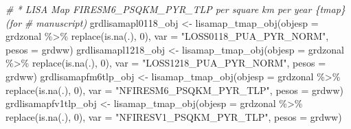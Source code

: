 \documentclass[10pt,landscape,a3paper]{article}
\newenvironment{Shaded}{\begin{snugshade}}{\end{snugshade}}
\newcommand{\AttributeTok}[1]{\textcolor[rgb]{0.77,0.63,0.00}{#1}}
\newcommand{\CommentTok}[1]{\textcolor[rgb]{0.56,0.35,0.01}{\textit{#1}}}
\newcommand{\DecValTok}[1]{\textcolor[rgb]{0.00,0.00,0.81}{#1}}
\newcommand{\FunctionTok}[1]{\textcolor[rgb]{0.00,0.00,0.00}{#1}}
\newcommand{\NormalTok}[1]{#1}
\newcommand{\OtherTok}[1]{\textcolor[rgb]{0.56,0.35,0.01}{#1}}
\newcommand{\SpecialCharTok}[1]{\textcolor[rgb]{0.00,0.00,0.00}{#1}}
\newcommand{\StringTok}[1]{\textcolor[rgb]{0.31,0.60,0.02}{#1}}
\begin{document}
\begin{Shaded}
\begin{Highlighting}[]

\CommentTok{\# * LISA Map FIRESM6\_PSQKM\_PYR\_TLP per square km per year \{tmap\} (for}
\CommentTok{\# manuscript)}
\NormalTok{grdlisamapl0118\_obj }\OtherTok{\textless{}{-}} \FunctionTok{lisamap\_tmap\_obj}\NormalTok{(}\AttributeTok{objesp =}\NormalTok{ grdzonal }\SpecialCharTok{\%\textgreater{}\%}
    \FunctionTok{replace}\NormalTok{(}\FunctionTok{is.na}\NormalTok{(.), }\DecValTok{0}\NormalTok{), }\AttributeTok{var =} \StringTok{"LOSS0118\_PUA\_PYR\_NORM"}\NormalTok{, }\AttributeTok{pesos =}\NormalTok{ grdww)}
\NormalTok{grdlisamapl1218\_obj }\OtherTok{\textless{}{-}} \FunctionTok{lisamap\_tmap\_obj}\NormalTok{(}\AttributeTok{objesp =}\NormalTok{ grdzonal }\SpecialCharTok{\%\textgreater{}\%}
    \FunctionTok{replace}\NormalTok{(}\FunctionTok{is.na}\NormalTok{(.), }\DecValTok{0}\NormalTok{), }\AttributeTok{var =} \StringTok{"LOSS1218\_PUA\_PYR\_NORM"}\NormalTok{, }\AttributeTok{pesos =}\NormalTok{ grdww)}
\NormalTok{grdlisamapfm6tlp\_obj }\OtherTok{\textless{}{-}} \FunctionTok{lisamap\_tmap\_obj}\NormalTok{(}\AttributeTok{objesp =}\NormalTok{ grdzonal }\SpecialCharTok{\%\textgreater{}\%}
    \FunctionTok{replace}\NormalTok{(}\FunctionTok{is.na}\NormalTok{(.), }\DecValTok{0}\NormalTok{), }\AttributeTok{var =} \StringTok{"NFIRESM6\_PSQKM\_PYR\_TLP"}\NormalTok{, }\AttributeTok{pesos =}\NormalTok{ grdww)}
\NormalTok{grdlisamapfv1tlp\_obj }\OtherTok{\textless{}{-}} \FunctionTok{lisamap\_tmap\_obj}\NormalTok{(}\AttributeTok{objesp =}\NormalTok{ grdzonal }\SpecialCharTok{\%\textgreater{}\%}
    \FunctionTok{replace}\NormalTok{(}\FunctionTok{is.na}\NormalTok{(.), }\DecValTok{0}\NormalTok{), }\AttributeTok{var =} \StringTok{"NFIRESV1\_PSQKM\_PYR\_TLP"}\NormalTok{, }\AttributeTok{pesos =}\NormalTok{ grdww)}


\end{Highlighting}
\end{Shaded}
\end{document}
